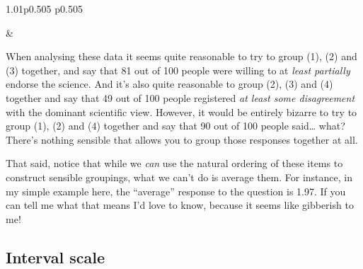 \documentclass[
]{book}
\begin{document}
\begin{table}[ht]
\begin{centerbox}
\begin{threeparttable}
\begin{tabularx}{1.01\textwidth}{p{} p{}}
\hhline{}

 &
 \tabularnewline[-0.5pt]


\end{tabularx}\captionsetup{justification=raggedright,singlelinecheck=off}
\caption{\label{tab:tab2-3} Attitudes to climate change}
 
\end{threeparttable}\par\end{centerbox}

\end{table}
 

When analysing these data it seems quite reasonable to try to group (1), (2) and (3) together, and say that 81 out of 100 people were willing to at \emph{least partially} endorse the science. And it's also quite reasonable to group (2), (3) and (4) together and say that 49 out of 100 people registered \emph{at least some disagreement} with the dominant scientific view. However, it would be entirely bizarre to try to group (1), (2) and (4) together and say that 90 out of 100 people said\ldots{} what? There's nothing sensible that allows you to group those responses together at all.

That said, notice that while we \emph{can} use the natural ordering of these items to construct sensible groupings, what we can't do is average them. For instance, in my simple example here, the ``average'' response to the question is 1.97. If you can tell me what that means I'd love to know, because it seems like gibberish to me!

\hypertarget{interval-scale}{%
\subsection{Interval scale}\label{interval-scale}}
\end{document}
